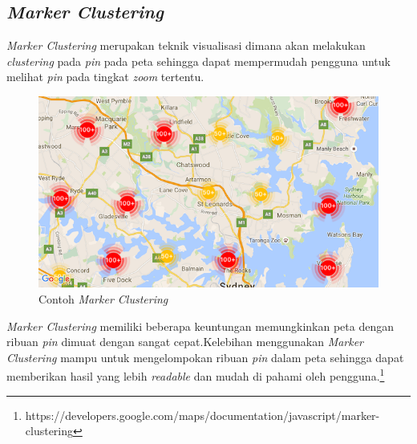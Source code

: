  
 \subsection{\textit{Marker Clustering}}
 \label{subsec:heat map}
 \textit{Marker Clustering } merupakan teknik visualisasi  dimana akan melakukan \textit{clustering} pada \textit{pin} pada peta sehingga dapat mempermudah pengguna untuk melihat \textit{pin} pada tingkat \textit{zoom} tertentu. 
 \begin{figure}[H]
    \centering
    \includegraphics[scale=0.5]{Gambar/markerclustering.png}
    \caption{Contoh \textit{Marker Clustering}}
    \label{fig:my_label}
\end{figure}

\textit{Marker Clustering} memiliki beberapa keuntungan memungkinkan peta dengan ribuan \textit{pin} dimuat dengan sangat cepat.Kelebihan menggunakan \textit{Marker Clustering} mampu untuk mengelompokan ribuan \textit{pin} dalam peta sehingga dapat memberikan hasil yang lebih \textit{readable} dan mudah di pahami oleh pengguna.\footnote{https://developers.google.com/maps/documentation/javascript/marker-clustering}